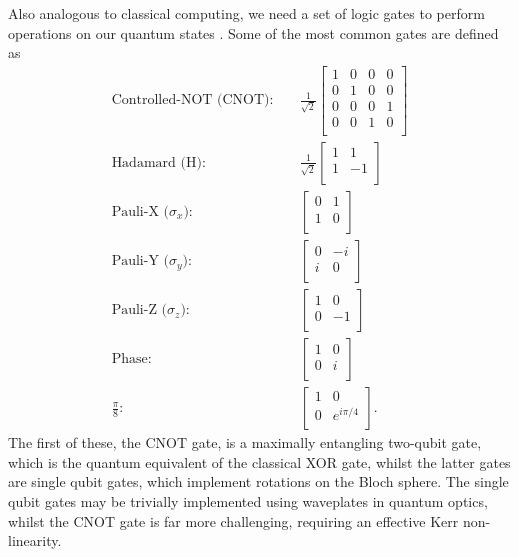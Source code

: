 \documentclass[aps,pra,twocolumn,amsmath,amssymb,nofootinbib,superscriptaddress]{revtex4}
\begin{document}
 Also analogous to classical computing, we need a set of logic gates to perform operations on our quantum states \cite{nielsen}. Some of the most common gates are defined as
\begin{eqnarray}
\textrm{Controlled-NOT (CNOT):} && \frac{1}{\sqrt{2}}\left[ 
\begin{array}{cccc}
1 & 0 & 0 & 0 \\
0 & 1 & 0 & 0 \\
0 & 0 & 0 & 1 \\
0 & 0 & 1 & 0 \\
\end{array} \right] \\ \nonumber
\textrm{Hadamard (H):} &&  \frac{1}{\sqrt{2}}\left[ 
\begin{array}{cc}
1&1 \\
1&-1 \\
\end{array} \right] \\ \nonumber
\textrm{Pauli-X ($\sigma_x$):} && \left[
\begin{array}{cc}
0&1\\
1&0\\
\end{array} \right] \\ \nonumber
\textrm{Pauli-Y ($\sigma_y$):} && \left[
\begin{array}{cc}
0&-i\\
i&0\\
\end{array} \right] \\ \nonumber
\textrm{Pauli-Z ($\sigma_z$):} && \left[
\begin{array}{cc}
1&0\\
0&-1\\
\end{array} \right] \\ \nonumber
\textrm{Phase:} && \left[
\begin{array}{cc}
1&0\\
0&i\\
\end{array} \right] \\
\frac{\pi}{8}: &\;& \left[
\begin{array}{cc}
1&0\\
0&e^{i \pi/4} \\
\end{array} \right]. \nonumber
\end{eqnarray}
The first of these, the CNOT gate, is a maximally entangling two-qubit gate, which is the quantum equivalent of the classical XOR gate, whilst the latter gates are single qubit gates, which implement rotations on the Bloch sphere. The single qubit gates may be trivially implemented using waveplates in quantum optics, whilst the CNOT gate is far more challenging, requiring an effective Kerr non-linearity.
\end{document}
